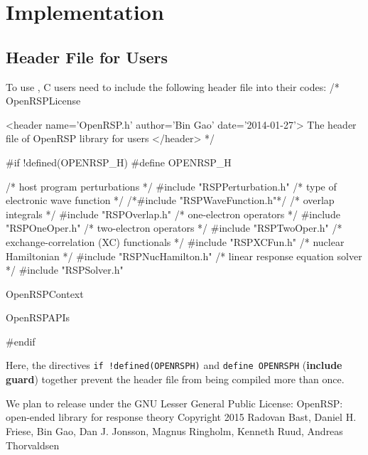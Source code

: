 \chapter{Implementation}
\label{chapter-implementation}

\section{Header File for Users}

To use \LibName, C users need to include the following header file into
their codes:
\nwenddocs{}\endmoddef
/*
  \LA{}OpenRSPLicense~{\nwtagstyle{}}\RA{}

  <header name='OpenRSP.h' author='Bin Gao' date='2014-01-27'>
    The header file of OpenRSP library for users
  </header>
*/

#if !defined(OPENRSP_H)
#define OPENRSP_H

/* host program perturbations */
#include "RSPPerturbation.h"
/* type of electronic wave function */
/*#include "RSPWaveFunction.h"*/
/* overlap integrals */
#include "RSPOverlap.h"
/* one-electron operators */
#include "RSPOneOper.h"
/* two-electron operators */
#include "RSPTwoOper.h"
/* exchange-correlation (XC) functionals */
#include "RSPXCFun.h"
/* nuclear Hamiltonian */
#include "RSPNucHamilton.h"
/* linear response equation solver */
#include "RSPSolver.h"

\LA{}OpenRSPContext~{\nwtagstyle{}}\RA{}

\LA{}OpenRSPAPIs~{\nwtagstyle{}}\RA{}

#endif

\nwendcode{}Here, the directives {\tt{}{}if\ !defined(OPENRSP{}H)} and {\tt{}{}define\ OPENRSP{}H}
(\textbf{include guard}) together prevent the header file
from being compiled more than once.

We plan to release \LibName under the GNU Lesser General Public
License:
\nwenddocs{}\endmoddef
OpenRSP: open-ended library for response theory
Copyright 2015 Radovan Bast,
               Daniel H. Friese,
               Bin Gao,
               Dan J. Jonsson,
               Magnus Ringholm,
               Kenneth Ruud,
               Andreas Thorvaldsen

